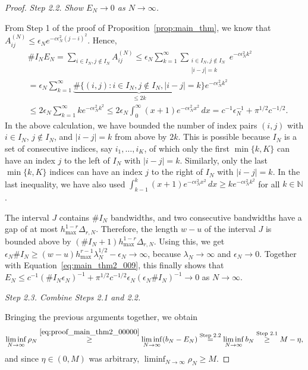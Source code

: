 \begin{proof}
    \textit{Step 2.2. Show $E_N\to0$ as $N\to\infty$.}

    From Step 1 of the proof of Proposition~\ref{prop:main_thm}, we know that $A_{ij}^{(N)}\le\epsilon_Ne^{-c\epsilon_N^2(j-i)^2}$. Hence,
    \begin{equation}\label{eq:main_thm2_009}
        \begin{aligned}
            &\#I_NE_N=\sum_{i\in I_N,j\notin I_N}A_{ij}^{(N)}\le\epsilon_N\sum_{k=1}^{\infty}\sum_{\substack{i\in I_N,j\notin I_N\\|i-j|=k}}e^{-c\epsilon_N^2k^2}\\&
            =\epsilon_N\sum_{k=1}^{\infty}\underbrace{\#\{(i,j):i\in I_N,j\notin I_N,|i-j|=k\}}_{\le2k}e^{-c\epsilon_N^2k^2}\\&
            \le2\epsilon_N\sum_{k=1}^{\infty}ke^{-c\epsilon_N^2k^2}\le2\epsilon_N\int_0^{\infty}(x+1)e^{-c\epsilon_N^2x^2}\,dx
            =c^{-1}\epsilon_N^{-1}+\pi^{1/2}c^{-1/2}.
        \end{aligned}
    \end{equation}
    In the above calculation, we have bounded the number of index pairs $(i,j)$ with $i\in I_N$, $j\notin I_N$, and $|i-j|=k$ from above by $2k$. This is possible because $I_N$ is a set of consecutive indices, say $i_1,\dots,i_K$, of which only the first $\min\{k,K\}$ can have an index $j$ to the left of $I_N$ with $|i-j|=k$. Similarly, only the last $\min\{k,K\}$ indices can have an index $j$ to the right of $I_N$ with $|i-j|=k$. In the last inequality, we have also used $\int_{k-1}^k(x+1)e^{-c\epsilon_N^2x^2}\,dx\ge ke^{-c\epsilon_N^2k^2}$ for all $k\in\mathbb{N}$.

    The interval $J$ contains $\#I_N$ bandwidths, and two consecutive bandwidths have a gap of at most $h_{\max}^{1-r}\Delta_{r,N}$. Therefore, the length $w-u$ of the interval $J$ is bounded above by $(\#I_N+1)h_{\max}^{1-r}\Delta_{r,N}$. Using this, we get $\epsilon_N\#I_N\ge(w-u)h_{\max}^{r-1}\lambda_N^{1/2}-\epsilon_N\to\infty$, because $\lambda_N\to\infty$ and $\epsilon_N\to0$. Together with Equation~\eqref{eq:main_thm2_009}, this finally shows that $E_N\le c^{-1}(\#I_N\epsilon_N)^{-1}+\pi^{1/2}c^{-1/2}\epsilon_N(\epsilon_N\#I_N)^{-1}\to0$ as $N\to\infty$.

    \textit{Step 2.3. Combine Steps 2.1 and 2.2.}

    Bringing the previous arguments together, we obtain
    \begin{align*}
        \liminf_{N\to\infty}\rho_N\stackrel{\eqref{eq:proof_main_thm2_00000}}{\ge}\liminf_{N\to\infty}(b_N-E_N)\stackrel{\text{Step 2.2}}{=}\liminf_{N\to\infty}b_N\stackrel{\text{Step 2.1}}{\ge}M-\eta,
    \end{align*}
    and since $\eta\in(0,M)$ was arbitrary, $\liminf_{N\to\infty}\rho_N\ge M$.


\end{proof}
